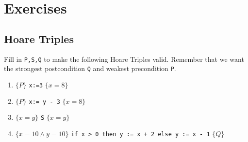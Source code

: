 \documentclass[oneside,11pt,dvipsnames]{book}
\newcommand{\code}[1]{\texttt{#1}}
\begin{document}






\section{Exercises}

\subsection{Hoare Triples}\label{exercise:hoare-tripples}

Fill in \texttt{P,S,Q} to make the following Hoare Triples valid. Remember that we want the strongest postcondition \code{Q} and weakest precondition \code{P}.

\begin{enumerate}
\item
  $\{P\}$ \code{x:=3} $\{x = 8\}$
\item
  $\{P\}$ \code{x:= y - 3} $\{x = 8\}$
\item
  $\{x = y\}$ \code{S} $\{x = y\}$
\item $\{ x=10 \land y = 10\}$ \code{if x > 0 then y := x + 2 else y := x - 1} $\{ Q\}$
\end{enumerate}
\end{document}
